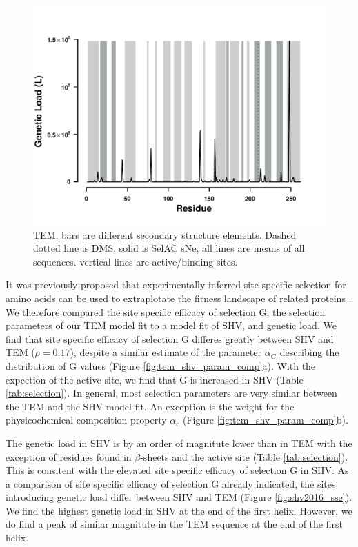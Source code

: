 \documentclass[12pt]{article}
\begin{document}
\begin{figure}[H]
     \centering
	\includegraphics[width=\textwidth]{img/GL_slide_TEM2016}
	\caption{TEM, bars are different secondary structure elements. Dashed dotted line is DMS, solid is SelAC sNe, all lines are means of all sequences. vertical lines are active/binding sites.}
	\label{fig:tem2016_sse}
\end{figure}

It was previously proposed that experimentally inferred site specific selection for amino acids can be used to extraplotate the fitness landscape of related proteins \citep{bloom2014}.
We therefore compared the site specific efficacy of selection G, the \selac selection parameters of our \selac TEM model fit to a \selac model fit of SHV, and genetic load.
We find that site specific efficacy of selection G differes greatly between SHV and TEM ($\rho = 0.17$), despite a similar estimate of the parameter $\alpha_G$ describing the distribution of G values (Figure \ref{fig:tem_shv_param_comp}a).
With the expection of the active site, we find that G is increased in SHV (Table \ref{tab:selection}).
In general, most \selac selection parameters are very similar between the TEM and the SHV model fit. 
An exception is the weight for the physicochemical composition property $\alpha_c$ (Figure \ref{fig:tem_shv_param_comp}b).

The genetic load in SHV is by an order of magnitute lower than in TEM with the exception of residues found in $\beta$-sheets and the active site (Table \ref{tab:selection}).
This is consitent with the elevated site specific efficacy of selection G in SHV.
As a comparison of site specific efficacy of selection G already indicated, the sites introducing genetic load differ between SHV and TEM (Figure \ref{fig:shv2016_sse}).
We find the highest genetic load in SHV at the end of the first helix.
However, we do find a peak of similar magnitute in the TEM sequence at the end of the first helix.
\end{document}
